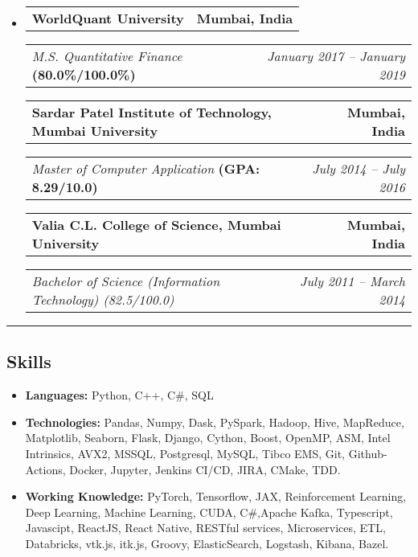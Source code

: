 \documentclass[11pt,a4paper]{article}
\makeatletter
\newcommand{\headerrow}[2]
{\begin{tabular*}{\linewidth}{l@{\extracolsep{\fill}}r}
#1 &
#2 \\
\end{tabular*}}
\makeatother
\begin{document}
\begin{itemize}[leftmargin=1em]
    \parskip=0.1em

      \item
            \headerrow
            {\textbf{WorldQuant University}}
            {\textbf{Mumbai, India}}
            \headerrow
            {\emph{M.S. Quantitative Finance} \textbf{(80.0\%/100.0\%)}}
            {\emph{January 2017 -- January 2019}}

            \headerrow
            {\textbf{Sardar Patel Institute of Technology, Mumbai University}}
            {\textbf{Mumbai, India}}
            \headerrow
            {\emph{Master of Computer Application} \textbf{(GPA: 8.29/10.0)}}
            {\emph{July 2014 -- July 2016}}

            \headerrow
            {\textbf{Valia C.L. College of Science, Mumbai University}}
            {\textbf{Mumbai, India}}
            \headerrow
            {\emph{Bachelor of Science (Information Technology) (82.5/100.0)}}
            {\emph{July 2011 -- March 2014}}
\end{itemize}


\hrule
\vspace{-1em}
\subsection*{\Large Skills}

\begin{itemize}[leftmargin=1em]
        \item \textbf{Languages:}
              Python, C++, C\#, SQL
        \item \textbf{Technologies:}
              Pandas, Numpy, Dask, PySpark, Hadoop, Hive, MapReduce, Matplotlib, Seaborn, Flask, Django, Cython, Boost, OpenMP, ASM, Intel Intrinsics, AVX2, MSSQL, Postgresql, MySQL, Tibco EMS, Git, Github-Actions, Docker, Jupyter, Jenkins CI/CD, JIRA, CMake, TDD.
        \item \textbf{Working Knowledge:}
              PyTorch, Tensorflow, JAX, Reinforcement Learning, Deep Learning, Machine Learning, CUDA, C\#,Apache Kafka, Typescript, Javascipt, ReactJS, React Native, RESTful services, Microservices, ETL, Databricks, vtk.js, itk.js, Groovy, ElasticSearch, Logstash, Kibana, Bazel.
\end{itemize}
\end{document}
